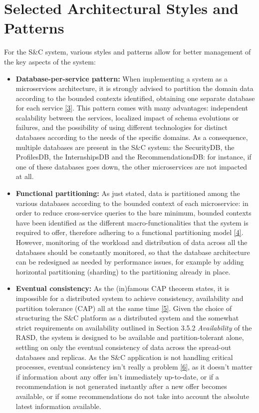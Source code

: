\newpage

\section{Selected Architectural Styles and Patterns}
\label{sec: patterns}%

For the S\&C system, various styles and patterns allow for better management of the key aspects of the system:

\begin{itemize}
    \item \textbf{Database-per-service pattern:} When implementing a system as a microservices architecture, it is strongly advised to partition the domain data according to the bounded contexts identified, obtaining one separate database for each service \hyperref[document: cloud_native_data_patters]{[3]}. This pattern comes with many advantages: independent scalability between the services, localized impact of schema evolutions or failures, and the possibility of using different technologies for distinct databases according to the needs of the specific domains. As a consequence, multiple databases are present in the S\&C system: the SecurityDB, the ProfilesDB, the InternshipsDB and the RecommendationsDB: for instance, if one of these databases goes down, the other microservices are not impacted at all.

    \item \textbf{Functional partitioning:} As just stated, data is partitioned among the various databases according to the bounded context of each microservice: in order to reduce cross-service queries to the bare minimum, bounded contexts have been identified as the different macro-functionalities that the system is required to offer, therefore adhering to a functional partitioning model \hyperref[document: data_partitioning]{[4]}. However, monitoring of the workload and distribution of data across all the databases should be constantly monitored, so that the database architecture can be redesigned as needed by performance issues, for example by adding horizontal partitioning (sharding) to the partitioning already in place.
    
    \item \textbf{Eventual consistency:} As the (in)famous CAP theorem states, it is impossible for a distributed system to achieve consistency, availability and partition tolerance (CAP) all at the same time \hyperref[document: relational_nosql_data]{[5]}. Given the choice of structuring the S\&C platform as a distributed system and the somewhat strict requirements on availability outlined in Section 3.5.2 \textit{Availability} of the RASD, the system is designed to be available and partition-tolerant alone, settling on only the eventual consistency of data across the spread-out databases and replicas. As the S\&C application is not handling critical processes, eventual consistency isn't really a problem \hyperref[document: data_consistency]{[6]}, as it doesn't matter if information about any offer isn't immediately up-to-date, or if a recommendation is not generated instantly after a new offer becomes available, or if some recommendations do not take into account the absolute latest information available.


\end{itemize}
